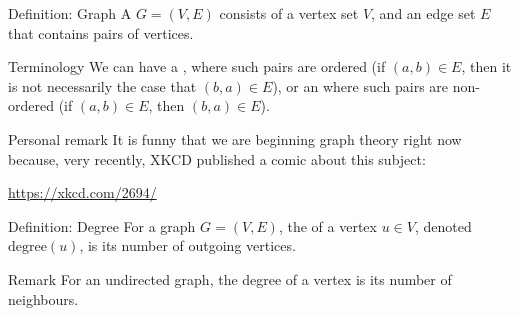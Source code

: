 \documentclass[a4paper]{article}
\begin{document}
\begin{parag}{Definition: Graph}
    A  $G = \left(V, E\right)$ consists of a vertex set $V$, and an edge set $E$ that contains pairs of vertices.

    \begin{subparag}{Terminology}
        We can have a , where such pairs are ordered (if $\left(a, b\right) \in E$, then it is not necessarily the case that $\left(b, a\right) \in E$), or an  where such pairs are non-ordered (if $\left(a, b\right) \in E$, then $\left(b, a\right) \in E$).

    \end{subparag}

    \begin{subparag}{Personal remark}
        It is funny that we are beginning graph theory right now because, very recently, XKCD published a comic about this subject:

        \begin{center}
            \url{https://xkcd.com/2694/}
        \end{center}
    \end{subparag}
\end{parag}

\begin{parag}{Definition: Degree}
    For a graph $G = \left(V, E\right)$, the  of a vertex $u \in V$, denoted $\text{degree}\left(u\right)$, is its number of outgoing vertices.

    \begin{subparag}{Remark}
        For an undirected graph, the degree of a vertex is its number of neighbours.
    \end{subparag}
\end{parag}
\end{document}
